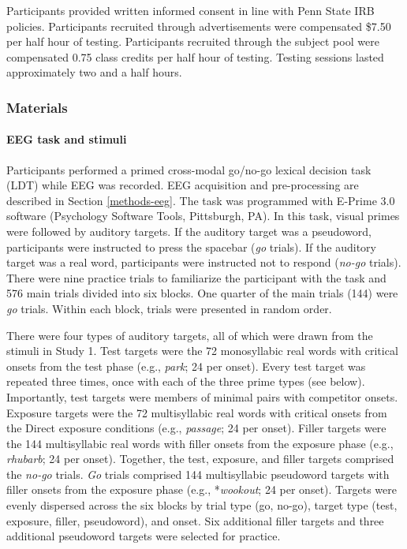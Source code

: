 \documentclass[
  12pt,
  twoside]{article}
\begin{document}
Participants provided written informed consent in line with Penn State IRB policies.
Participants recruited through advertisements were compensated \$7.50 per half hour of testing.
Participants recruited through the subject pool were compensated 0.75 class credits per half hour of testing.
Testing sessions lasted approximately two and a half hours.

\hypertarget{materials}{%
\subsubsection{Materials}\label{materials}}

\hypertarget{eeg-task-and-stimuli}{%
\paragraph{EEG task and stimuli}\label{eeg-task-and-stimuli}}

Participants performed a primed cross-modal go/no-go lexical decision task (LDT) while EEG was recorded.
EEG acquisition and pre-processing are described in Section \ref{methods-eeg}.
The task was programmed with E-Prime 3.0 software (Psychology Software Tools, Pittsburgh, PA).
In this task, visual primes were followed by auditory targets.
If the auditory target was a pseudoword, participants were instructed to press the spacebar (\emph{go} trials).
If the auditory target was a real word, participants were instructed not to respond (\emph{no-go} trials).
There were nine practice trials to familiarize the participant with the task and 576 main trials divided into six blocks.
One quarter of the main trials (144) were \emph{go} trials.
Within each block, trials were presented in random order.

There were four types of auditory targets, all of which were drawn from the stimuli in Study 1.
Test targets were the 72 monosyllabic real words with critical onsets from the test phase (e.g., \emph{park}; 24 per onset).
Every test target was repeated three times, once with each of the three prime types (see below).
Importantly, test targets were members of minimal pairs with competitor onsets.
Exposure targets were the 72 multisyllabic real words with critical onsets from the Direct exposure conditions (e.g., \emph{passage}; 24 per onset).
Filler targets were the 144 multisyllabic real words with filler onsets from the exposure phase (e.g., \emph{rhubarb}; 24 per onset).
Together, the test, exposure, and filler targets comprised the \emph{no-go} trials.
\emph{Go} trials comprised 144 multisyllabic pseudoword targets with filler onsets from the exposure phase (e.g., *\emph{wookout}; 24 per onset).
Targets were evenly dispersed across the six blocks by trial type (go, no-go), target type (test, exposure, filler, pseudoword), and onset.
Six additional filler targets and three additional pseudoword targets were selected for practice.
\end{document}
